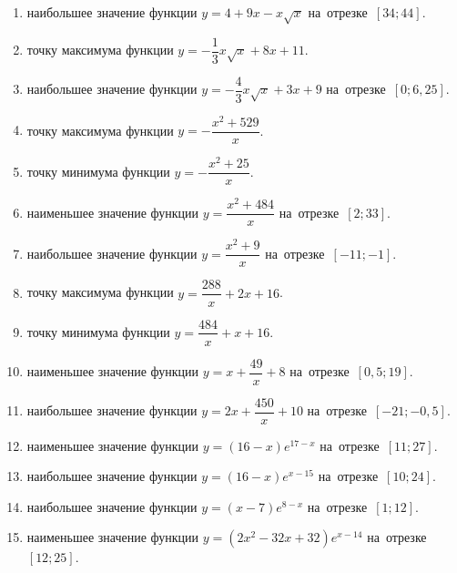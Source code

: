 \documentclass[a4paper,10pt]{article}
\begin{document}
\begin{enumerate}
\item {} наибольшее значение функции $y=4+9x -x\sqrt{x}$ на~отрезке~$\left[34;44\right]$.

\item {} точку максимума функции $y=-\dfrac{1}{3}x\sqrt{x} +8x+11$.

\item {} наибольшее значение функции $y=-\dfrac{4}{3}x\sqrt{x} +3x+9$ на~отрезке~$\left[0;6,25\right]$.

\item {} точку максимума функции $y=-\dfrac{x^2 +529}{x}$.

\item {} точку минимума функции $y=-\dfrac{x^2 +25}{x}$.

\item {} наименьшее значение функции $y=\dfrac{x^2 +484}{x}$ на~отрезке~$\left[2;33\right]$.

\item {} наибольшее значение функции $y=\dfrac{x^2 +9}{x}$ на~отрезке~$\left[-11;-1\right]$.

\item {} точку максимума функции $y=\dfrac{288}{x} +2x+16$.

\item {} точку минимума функции $y=\dfrac{484}{x} +x+16$.

\item {} наименьшее значение функции $y=x+\dfrac{49}{x} +8$ на~отрезке~$\left[0,5;19\right]$.

\item {} наибольшее значение функции $y=2x+\dfrac{450}{x} +10$ на~отрезке~$\left[-21;-0,5\right]$.

\item {} наименьшее значение функции $y=\left(16-x\right)e^{17-x}$ на~отрезке~$\left[11;27\right]$.

\item {} наибольшее значение функции $y=\left(16-x\right)e^{x-15}$ на~отрезке~$\left[10;24\right]$.

\item {} наибольшее значение функции $y=\left(x-7\right)e^{8-x}$ на~отрезке~$\left[1;12\right]$.

\item {} наименьшее значение функции $y=\left(2x^2 -32x +32\right)e^{x -14}$ на~отрезке~$\left[12;25\right]$.


\end{enumerate}
\end{document}
